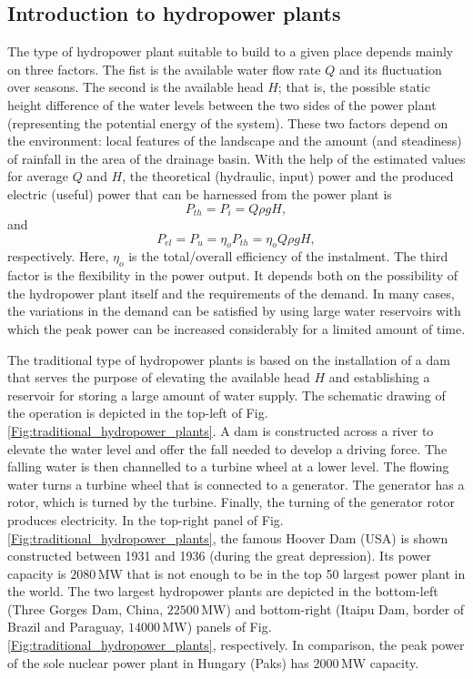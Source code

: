 \subsection{Introduction to hydropower plants} \label{introduction_to_hydropower}
The type of hydropower plant suitable to build to a given place depends mainly on three factors.  The fist is the available water flow rate $Q$ and its fluctuation over seasons. The second is the available head $H$; that is, the possible static height difference of the water levels between the two sides of the power plant (representing the potential energy of the system). These two factors depend on the environment: local features of the landscape and the amount (and steadiness) of rainfall in the area of the drainage basin. With the help of the estimated values for average $Q$ and $H$, the theoretical (hydraulic, input) power and the produced electric (useful) power that can be harnessed from the power plant is
%
\begin{equation} \label{theoretical_power_hydropower}
P_{th} = P_{i} = Q \rho g H,
\end{equation}
%
and
\begin{equation} \label{electric_power_hydropower}
P_{el} = P_u = \eta_o P_{th} = \eta_o Q \rho g H,
\end{equation}
%
respectively. Here, $\eta_o$ is the total/overall efficiency of the instalment. The third factor is the flexibility in the power output. It depends both on the possibility of the hydropower plant itself and the requirements of the demand. In many cases, the variations in the demand can be satisfied by using large water reservoirs with which the peak power can be increased considerably for a limited amount of time.

The traditional type of hydropower plants is based on the installation of a dam that serves the purpose of elevating the available head $H$ and establishing a reservoir for storing a large amount of water supply. The schematic drawing of the operation is depicted in the top-left of Fig.\,\ref{Fig:traditional_hydropower_plants}. A dam is constructed across a river to elevate the water level and offer the fall needed to develop a driving force. The falling water is then channelled to a turbine wheel at a lower level. The flowing water turns a turbine wheel that is connected to a generator. The generator has a rotor, which is turned by the turbine. Finally, the turning of the generator rotor produces electricity. In the top-right panel of Fig.\,\ref{Fig:traditional_hydropower_plants}, the famous Hoover Dam (USA) is shown constructed between 1931 and 1936 (during the great depression). Its power capacity is $2080\,\mathrm{MW}$ that is not enough to be in the top 50 largest power plant in the world. The two largest hydropower plants are depicted in the bottom-left (Three Gorges Dam, China, $22500\,\mathrm{MW}$) and bottom-right (Itaipu Dam, border of  Brazil and Paraguay, $14000\,\mathrm{MW}$) panels of Fig.\,\ref{Fig:traditional_hydropower_plants}, respectively. In comparison, the peak power of the sole nuclear power plant in Hungary (Paks) has $2000\,\mathrm{MW}$ capacity.

